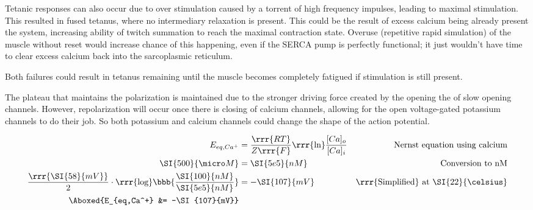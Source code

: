 \documentclass[basic]{inVerba-notes}
\begin{document}
\begin{enumerate}
  Tetanic responses can also occur due to over stimulation caused by a torrent of high frequency impulses, leading to maximal stimulation. This resulted in fused tetanus, where no intermediary relaxation is present. This could be the result of excess calcium being already present the system, increasing ability of twitch summation to reach the maximal contraction state. Overuse (repetitive rapid simulation) of the muscle without reset would increase chance of this happening, even if the SERCA pump is perfectly functional; it just wouldn't have time to clear excess calcium back into the sarcoplasmic reticulum.

  Both failures could result in tetanus remaining until the muscle becomes completely fatigued if stimulation is still present.


  The plateau that maintains the polarization is maintained due to the stronger driving force created by the opening the of slow opening  channels. However, repolarization will occur once there is closing of calcium channels, allowing for the open voltage-gated potassium channels to do their job. So both potassium and calcium channels could change the shape of the action potential.
  
  \begin{align*}
      E_{eq,Ca^+} &= \frac{\rrr{RT}}{Z\rrr{F}}\text{\rrr{ln}}{\frac{[Ca]_{o}}{[Ca]_{i}}} & \text{Nernst equation using calcium} \\
      \SI{500}{\micro M} &= \SI{5e5}{nM} & \text{Conversion to nM}\\
      \frac{\rrr{\SI{58}{mV}}}{2}\cdot \rrr{\text{log}}\bbb{\frac{\SI{100}{nM}}{\SI{5e5}{nM}}}&=-\SI{107}{mV} & \text{\rrr{Simplified} at \SI{22}{\celsius}}\\
      \Aboxed{E_{eq,Ca^+} &= -\SI{107}{mV}}
  \end{align*}


\end{enumerate}
\end{document}
